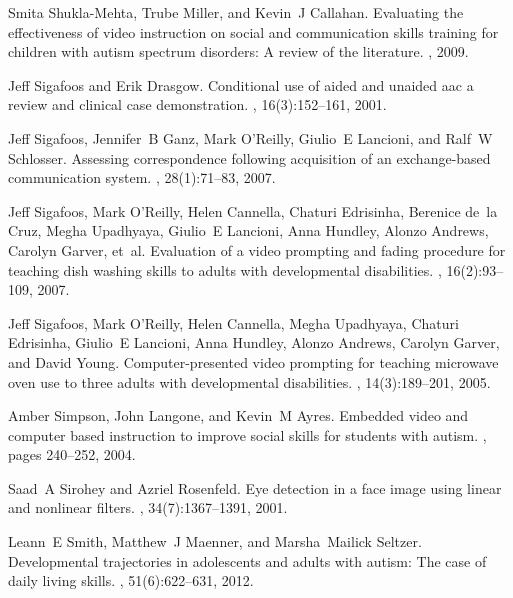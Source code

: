 \documentclass{ut-thesis}
\begin{document}
\begin{thebibliography}{100}
Smita Shukla-Mehta, Trube Miller, and Kevin~J Callahan.
\newblock Evaluating the effectiveness of video instruction on social and
  communication skills training for children with autism spectrum disorders: A
  review of the literature.
, 2009.

Jeff Sigafoos and Erik Drasgow.
\newblock Conditional use of aided and unaided aac a review and clinical case
  demonstration.
,
  16(3):152--161, 2001.

Jeff Sigafoos, Jennifer~B Ganz, Mark O’Reilly, Giulio~E Lancioni, and Ralf~W
  Schlosser.
\newblock Assessing correspondence following acquisition of an exchange-based
  communication system.
, 28(1):71--83, 2007.

Jeff Sigafoos, Mark O’Reilly, Helen Cannella, Chaturi Edrisinha, Berenice
  de~la Cruz, Megha Upadhyaya, Giulio~E Lancioni, Anna Hundley, Alonzo Andrews,
  Carolyn Garver, et~al.
\newblock Evaluation of a video prompting and fading procedure for teaching
  dish washing skills to adults with developmental disabilities.
, 16(2):93--109, 2007.

Jeff Sigafoos, Mark O’Reilly, Helen Cannella, Megha Upadhyaya, Chaturi
  Edrisinha, Giulio~E Lancioni, Anna Hundley, Alonzo Andrews, Carolyn Garver,
  and David Young.
\newblock Computer-presented video prompting for teaching microwave oven use to
  three adults with developmental disabilities.
, 14(3):189--201, 2005.

Amber Simpson, John Langone, and Kevin~M Ayres.
\newblock Embedded video and computer based instruction to improve social
  skills for students with autism.
, pages
  240--252, 2004.

Saad~A Sirohey and Azriel Rosenfeld.
\newblock Eye detection in a face image using linear and nonlinear filters.
, 34(7):1367--1391, 2001.

Leann~E Smith, Matthew~J Maenner, and Marsha~Mailick Seltzer.
\newblock Developmental trajectories in adolescents and adults with autism: The
  case of daily living skills.
, 51(6):622--631, 2012.


\end{thebibliography}
\end{document}
